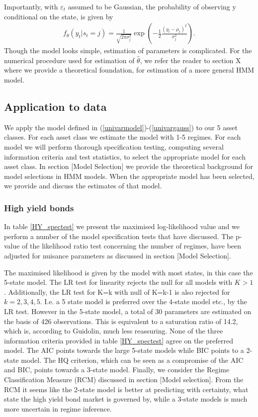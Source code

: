\documentclass[11pt,a4paper,oneside]{article}
\newcommand{\lp}{\left(}
\newcommand{\rp}{\right)}
\begin{document}
Importantly, with $\varepsilon_t$ assumed to be Gaussian, the  probability of observing y conditional on the state, is given by
\begin{align}
    f_\theta(y_t\vert s_t=j)=\frac{1}{\sqrt{2\pi\sigma_j^2}}\exp{\lp-\frac{1}{2} \frac{(y_t-\mu_t)^2}{\sigma_j^2}\rp}\label{univargauss}.
\end{align}
Though the model looks simple, estimation of parameters is complicated. For the numerical procedure used for estimation of $\hat{\theta}$, we refer the reader to section X where we provide a theoretical foundation, for estimation of a more general HMM model. 

\newpage

\subsection{Application to data}  
\noindent We apply the model defined in  (\ref{univarmodel})-(\ref{univargauss}) to our 5 asset classes. For each asset class we estimate the model with 1-5 regimes. For each model we will perform thorough specification testing, computing several information criteria and test statistics, to select the appropriate model for each asset class. In section [Model Selection] we provide the theoretical background for model selections in HMM models. When the appropriate model has been selected, we provide and discuss the estimates of that model. 

\subsubsection*{High yield bonds}
\noindent In table \ref{HY_spectest} we present the maximised log-likelihood value and we perform a number of the model specification tests that have discussed. The p-value of the likelihood ratio test concerning the number of regimes, have been adjusted for nuisance parameters as discussed in section [Model Selection]. 

The maximised likelihood is given by the model with most states, in this case the 5-state model. The LR test for linearity rejects the null for all models with $K>1$. Additionally, the LR test for K=k with null of K=k-1 is also rejected for $k=2,3,4,5$. I.e. a 5 state model is preferred over the 4-state model etc., by the LR test. However in the 5-state model, a total of 30 parameters are estimated on the basis of 426 observations. This is equivalent to a saturation ratio of 14.2, which is, according to Guidolin, much less reassuring. None of the three information criteria provided in table \ref{HY_spectest} agree on the preferred model. The AIC points towards the large 5-state models while BIC points to a 2-state model. The HQ criterion, which can be seen as a compromise of the AIC and BIC, points towards a 3-state model. Finally, we consider the Regime Classification Measure (RCM) discussed in section [Model selection]. From the RCM it seems like the 2-state model is better at predicting with certainty, what state the high yield bond market is governed by, while a 3-state models is much more uncertain in regime inference. 
\end{document}

